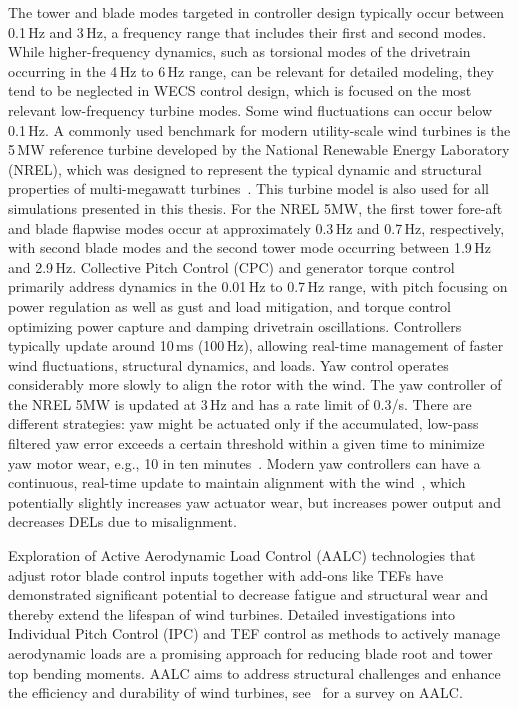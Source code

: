 The tower and blade modes targeted in controller design typically occur between 0.1\,Hz and 3\,Hz, a frequency range that includes their first and second modes. While higher-frequency dynamics, such as torsional modes of the drivetrain occurring in the 4\,Hz to 6\,Hz range, can be relevant for detailed modeling, they tend to be neglected in WECS control design, which is focused on the most relevant low-frequency turbine modes. Some wind fluctuations can occur below 0.1\,Hz. A commonly used benchmark for modern utility-scale wind turbines is the 5\,MW reference turbine developed by the National Renewable Energy Laboratory (NREL), which was designed to represent the typical dynamic and structural properties of multi-megawatt turbines~\cite{jonkman2009definition}. This turbine model is also used for all simulations presented in this thesis. For the NREL 5MW, the first tower fore-aft and blade flapwise modes occur at approximately 0.3\,Hz and 0.7\,Hz, respectively, with second blade modes and the second tower mode occurring between 1.9\,Hz and 2.9\,Hz. Collective Pitch Control (CPC) and generator torque control primarily address dynamics in the 0.01\,Hz to 0.7\,Hz range, with pitch focusing on power regulation as well as gust and load mitigation, and torque control optimizing power capture and damping drivetrain oscillations. Controllers typically update around 10\,ms (100\,Hz), allowing real-time management of faster wind fluctuations, structural dynamics, and loads. Yaw control operates considerably more slowly to align the rotor with the wind. The yaw controller of the NREL 5MW is updated at 3\,Hz and has a rate limit of 0.3\textdegree/s. There are different strategies: yaw might be actuated only if the accumulated, low-pass filtered yaw error exceeds a certain threshold within a given time to minimize yaw motor wear, e.g., 10\textdegree{} in ten minutes~\cite{fleming2014yawmisalignment}. Modern yaw controllers can have a continuous, real-time update to maintain alignment with the wind~\cite{stanley2022yawoptimization}, which potentially slightly increases yaw actuator wear, but increases power output and decreases DELs due to misalignment.
 
Exploration of Active Aerodynamic Load Control (AALC) technologies that adjust rotor blade control inputs together with add-ons like TEFs have demonstrated significant potential to decrease fatigue and structural wear and thereby extend the lifespan of wind turbines. Detailed investigations into Individual Pitch Control (IPC) and TEF control as methods to actively manage aerodynamic loads are a promising approach for reducing blade root and tower top bending moments. AALC aims to address structural challenges and enhance the efficiency and durability of wind turbines, see~\cite{aubrun2017review} for a survey on AALC.

